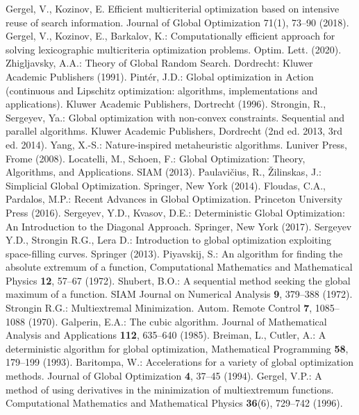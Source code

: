 \documentclass[runningheads]{llncs}
\begin{document}
\begin{thebibliography}{1}
 Gergel, V., Kozinov, E. Efficient multicriterial optimization based on intensive reuse of search information. Journal of Global Optimization 71(1), 73--90 (2018).
 Gergel, V., Kozinov, E., Barkalov, K.: Computationally efficient approach for solving lexicographic multicriteria optimization problems. Optim. Lett. (2020). 
 Zhigljavsky, A.A.: Theory of Global Random Search. Dordrecht: Kluwer Academic Publishers (1991).
 Pint{\' e}r, J.D.: Global optimization in Action (continuous and Lipschitz optimization: algorithms, implementations and applications). Kluwer Academic Publishers, Dortrecht (1996).
 Strongin, R., Sergeyev, Ya.: Global optimization with non-convex constraints. Sequential and parallel algorithms. Kluwer Academic Publishers, Dordrecht (2nd ed. 2013, 3rd ed. 2014).
 Yang, X.-S.: Nature-inspired metaheuristic algorithms. Luniver Press, Frome (2008).
 Locatelli, M., Schoen, F.: Global Optimization: Theory, Algorithms, and Applications. SIAM (2013).
 Paulavi{\v c}ius, R., {\v Z}ilinskas, J.: Simplicial Global Optimization. Springer, New York (2014). 
 Floudas, C.A., Pardalos, M.P.: Recent Advances in Global Optimization. Princeton University Press (2016).
 Sergeyev, Y.D., Kvasov, D.E.: Deterministic Global Optimization: An Introduction to the Diagonal Approach. Springer, New York (2017). 
 Sergeyev Y.D., Strongin R.G., Lera D.: Introduction to global optimization exploiting space-filling curves. Springer (2013).
 Piyavskij, S.: An algorithm for finding the absolute extremum of a function, Computational Mathematics and Mathematical Physics \textbf{12}, 57--67 (1972).
 Shubert, B.O.: A sequential method seeking the global maximum of a function. SIAM Journal on Numerical Analysis \textbf{9}, 379--388 (1972).
 Strongin R.G.: Multiextremal Minimization. Autom. Remote Control \textbf{7}, 1085--1088 (1970).
 Galperin, E.A.: The cubic algorithm. Journal of Mathematical Analysis and Applications \textbf{112}, 635--640 (1985).
 Breiman, L., Cutler, A.: A deterministic algorithm for global optimization, Mathematical Programming \textbf{58}, 179--199 (1993).
 Baritompa, W.: Accelerations for a variety of global optimization methods. Journal of Global Optimization \textbf{4}, 37--45 (1994).
 Gergel, V.P.: A method of using derivatives in the minimization of multiextremum functions. Computational Mathematics and Mathematical Physics \textbf{36}(6), 729--742 (1996).

\end{thebibliography}
\end{document}
